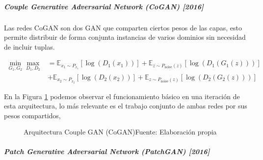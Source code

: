 
\subparagraph*{Couple Generative Adversarial Network (CoGAN) [2016]}

Las redes \gls{CoGAN} \cite{CoGAN-liu2016coupled} son dos \gls{GAN} que comparten ciertos pesos de las capas, esto permite distribuir de forma conjunta instancias de varios dominios sin necesidad de incluir tuplas.


\begin{equation}
    \begin{split}
        \min_{G_{1},G_{2}}\max_{D_{1},D_{2}}
        & = \mathbb{E}_{x_{1}\sim{}P_{x_{1}}}  \left[ \log{\left( D_{1}(x_{1}) \right)} \right] + \mathbb{E}_{z\sim{}P_{\text{noise}}(z)}      \left[ \log{\left( D_{1}(G_{1}(z))  \right)} \right]   \\
        & + \mathbb{E}_{x_{2}\sim{}P_{x_{2}}}  \left[ \log{\left( D_{2}(x_{2}) \right)} \right] + \mathbb{E}_{z\sim{}P_{\text{noise}}(z)}      \left[ \log{\left( D_{2}(G_{2}(z))  \right)} \right]
    \end{split}
\end{equation}

En la Figura \ref{fig:CoGAN} podemos observar el funcionamiento básico en una iteración de esta arquitectura, lo más relevante es el trabajo  conjunto de ambas redes por sus pesos compartidos,

\begin{figure}[H]
    \centering
    \centerline{}
    \caption{Arquitectura Couple GAN (CoGAN)\newline{}Fuente: Elaboración propia}
    \label{fig:CoGAN}
\end{figure}



\subparagraph*{Patch Generative Adversarial Network (PatchGAN) [2016]}

